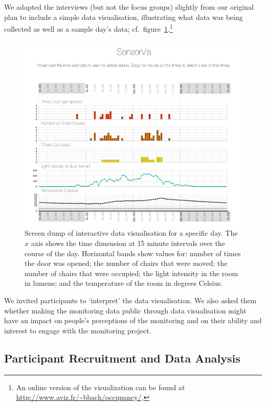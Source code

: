 We adapted the interviews (but not the focus groups) slightly from our
original plan to include a simple data visualisation, illustrating what data was being
collected as well as a sample day’s data; cf.\ 
figure~\ref{fig:dataviz}.\footnote{
An online version of the visualization can be found at \url{http://www.aviz.fr/~bbach/occupancy/}.
}
\begin{figure}
  \centering
  \includegraphics[scale=0.35]{images/occupancy.png}
  \caption{Screen dump of interactive data visualisation for a
    specific day. The $x$ axis shows the time dimension at 15 minute
    intervals over the course of the day. Horizontal bands show values
    for:  number of times the
    door was opened; the number of chairs that were moved; the number
    of chairs that were occupied; the light intensity in the room
    in lumens; and the temperature of the room in degrees Celsius.}
  \label{fig:dataviz}
\end{figure}
 We invited
participants to `interpret’ the data visualisation. We also asked them
whether making the monitoring data public through data visualisation
might have an impact on people’s perceptions of the monitoring and on
their ability and interest to engage with the monitoring project.

\subsection{Participant Recruitment and Data Analysis}
\label{sec:recruitment}


